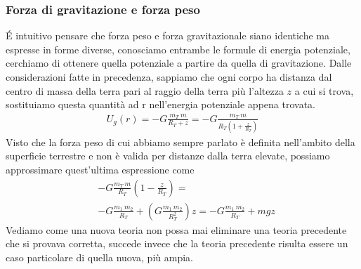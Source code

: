 \subsubsection{Forza di gravitazione e forza peso}
\'{E} intuitivo pensare che forza peso e forza gravitazionale siano identiche ma espresse in forme diverse, conosciamo entrambe le formule di energia potenziale, cerchiamo di ottenere quella potenziale a partire da quella di gravitazione. Dalle considerazioni fatte in precedenza, sappiamo che ogni corpo ha distanza dal centro di massa della terra pari al raggio della terra più l'altezza $z$ a cui si trova, sostituiamo questa quantità ad r nell'energia potenziale appena trovata.
\begin{align*}
U_g(r) = -G\frac{m_T\ m}{R_T+z} = -G\frac{m_T\ m}{R_T(1+\frac{z}{R_T})}
\end{align*}
Visto che la forza peso di cui abbiamo sempre parlato è definita nell'ambito della superficie terrestre e non è valida per distanze dalla terra elevate, possiamo approssimare quest'ultima espressione come
\begin{align*}
&-G\frac{m_T\ m}{R_T}(1-\frac{z}{R_T})=\\
&-G\frac{m_1\ m_2}{R_T} + (G\frac{m_1\ m_2}{R_T^2})z = -G\frac{m_1\ m_2}{R_T} + mg z
\end{align*}
Vediamo come una nuova teoria non possa mai eliminare una teoria precedente che si provava corretta, succede invece che la teoria precedente risulta essere un caso particolare di quella nuova, più ampia. 
